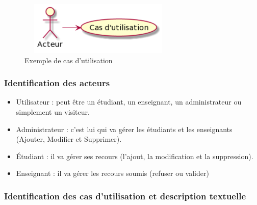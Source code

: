 \documentclass[12pt]{report}
\begin{document}
\vspace{0.2in}

\begin{figure}[h]
\centering
    \includegraphics[width = 3.0in, height = 1.0in]{../Images/usecaseEG.png}
    \caption{Exemple de cas d'utilisation}
\end{figure}

\newpage

\subsubsection{Identification des acteurs}
\begin{itemize}
\item Utilisateur : peut être un étudiant, un enseignant, un administrateur ou simplement un visiteur.
\item Administrateur : c'est lui qui va gérer les étudiants et les enseignants (Ajouter, Modifier et Supprimer).
\item Étudiant : il va gérer ses recours (l'ajout, la modification et la suppression).
\item Enseignant : il va gérer les recours soumis (refuser ou valider)
\end{itemize}

\subsubsection{Identification des cas d'utilisation et description textuelle}
\end{document}
